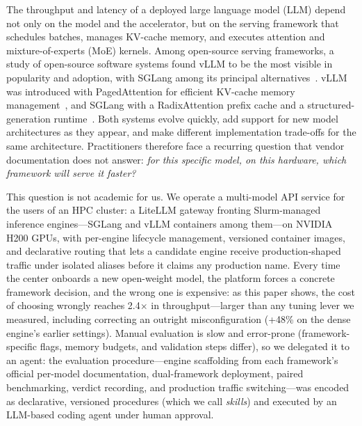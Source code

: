 \documentclass[11pt]{article}
\begin{document}
The throughput and latency of a deployed large language model (LLM) depend not only on the model and the accelerator, but on the serving framework that schedules batches, manages KV-cache memory, and executes attention and mixture-of-experts (MoE) kernels. Among open-source serving frameworks, a study of open-source software systems found vLLM to be the most visible in popularity and adoption, with SGLang among its principal alternatives~\cite{majidi2026wild}. vLLM was introduced with PagedAttention for efficient KV-cache memory management~\cite{kwon2023vllm}, and SGLang with a RadixAttention prefix cache and a structured-generation runtime~\cite{zheng2024sglang}. Both systems evolve quickly, add support for new model architectures as they appear, and make different implementation trade-offs for the same architecture. Practitioners therefore face a recurring question that vendor documentation does not answer: \emph{for this specific model, on this hardware, which framework will serve it faster?}

This question is not academic for us. We operate a multi-model API service for the users of an HPC cluster: a LiteLLM gateway fronting Slurm-managed inference engines---SGLang and vLLM containers among them---on NVIDIA H200 GPUs, with per-engine lifecycle management, versioned container images, and declarative routing that lets a candidate engine receive production-shaped traffic under isolated aliases before it claims any production name. Every time the center onboards a new open-weight model, the platform forces a concrete framework decision, and the wrong one is expensive: as this paper shows, the cost of choosing wrongly reaches 2.4$\times$ in throughput---larger than any tuning lever we measured, including correcting an outright misconfiguration (+48\% on the dense engine's earlier settings). Manual evaluation is slow and error-prone (framework-specific flags, memory budgets, and validation steps differ), so we delegated it to an agent: the evaluation procedure---engine scaffolding from each framework's official per-model documentation, dual-framework deployment, paired benchmarking, verdict recording, and production traffic switching---was encoded as declarative, versioned procedures (which we call \emph{skills}) and executed by an LLM-based coding agent under human approval.
\end{document}
